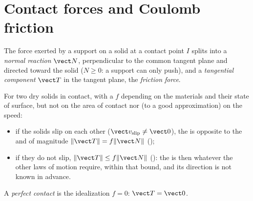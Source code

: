 \section{Contact forces and Coulomb friction}

\begin{definition}\label{def:b2:rigid-body-mechanics:contact}
The force exerted by a support on a solid at a contact point $I$ splits
into a \emph{normal reaction} $\vect N$, perpendicular to the common
tangent plane and directed toward the solid ($N \ge 0$: a support can
only push), and a \emph{tangential component} $\vect T$ in the tangent
plane, the \emph{friction force}.
\end{definition}

\begin{theorem}\label{thm:b2:rigid-body-mechanics:coulomb}
For two dry solids in contact, with a \emph{} $f$
depending on the materials and their state of surface, but not on the
area of contact nor (to a good approximation) on the speed:
\begin{itemize}
  \item if the solids slip on each other ($\vect v_{\text{slip}} \ne
        \vect 0$), the  is opposite to the 
        and of magnitude $\|\vect T\| = f\|\vect N\|$ ();
  \item if they do not slip, $\|\vect T\| \le f\|\vect N\|$ (): the  is then whatever the other laws of
        motion require, within that bound, and its direction is not
        known in advance.
\end{itemize}
A \emph{perfect contact} is the idealization $f = 0$: $\vect T = \vect 0$.
\end{theorem}
\admitted

